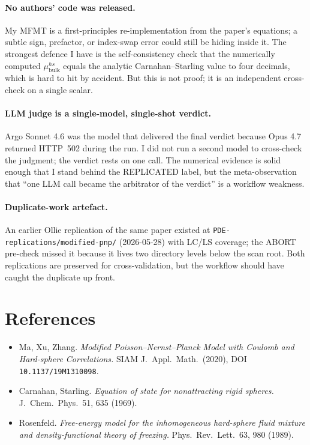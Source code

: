 \documentclass[11pt]{article}
\begin{document}
\paragraph{No authors' code was released.} My MFMT is a
first-principles re-implementation from the paper's equations; a
subtle sign, prefactor, or index-swap error could still be hiding
inside it. The strongest defence I have is the self-consistency
check that the numerically computed $\mu^{hs}_{\text{bulk}}$ equals
the analytic Carnahan--Starling value to four decimals, which is
hard to hit by accident. But this is not proof; it is an independent
cross-check on a single scalar.

\paragraph{LLM judge is a single-model, single-shot verdict.} Argo
Sonnet 4.6 was the model that delivered the final verdict because
Opus 4.7 returned HTTP~502 during the run. I did not run a second
model to cross-check the judgment; the verdict rests on one call.
The numerical evidence is solid enough that I stand behind the
REPLICATED label, but the meta-observation that ``one LLM call
became the arbitrator of the verdict'' is a workflow weakness.

\paragraph{Duplicate-work artefact.} An earlier Ollie replication of
the same paper existed at \texttt{PDE-replications/modified-pnp/}
(2026-05-28) with LC/LS coverage; the ABORT pre-check missed it
because it lives two directory levels below the scan root. Both
replications are preserved for cross-validation, but the workflow
should have caught the duplicate up front.

\section{References}
\begin{itemize}
\item Ma, Xu, Zhang. \emph{Modified Poisson--Nernst--Planck Model with
  Coulomb and Hard-sphere Correlations.} SIAM J.\ Appl.\ Math.\ (2020),
  DOI \texttt{10.1137/19M1310098}.
\item Carnahan, Starling. \emph{Equation of state for nonattracting
  rigid spheres.} J.\ Chem.\ Phys.\ 51, 635 (1969).
\item Rosenfeld. \emph{Free-energy model for the inhomogeneous
  hard-sphere fluid mixture and density-functional theory of
  freezing.} Phys.\ Rev.\ Lett.\ 63, 980 (1989).
\end{itemize}
\end{document}
